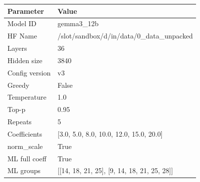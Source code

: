 \begin{tabular}{ll}
\toprule
Parameter & Value \\
\midrule
Model ID & gemma3_12b \\
HF Name & /slot/sandbox/d/in/data/0_data_unpacked \\
Layers & 36 \\
Hidden size & 3840 \\
Config version & v3 \\
Greedy & False \\
Temperature & 1.0 \\
Top-p & 0.95 \\
Repeats & 5 \\
Coefficients & [3.0, 5.0, 8.0, 10.0, 12.0, 15.0, 20.0] \\
norm\_scale & True \\
ML full coeff & True \\
ML groups & [[14, 18, 21, 25], [9, 14, 18, 21, 25, 28]] \\
\bottomrule
\end{tabular}
